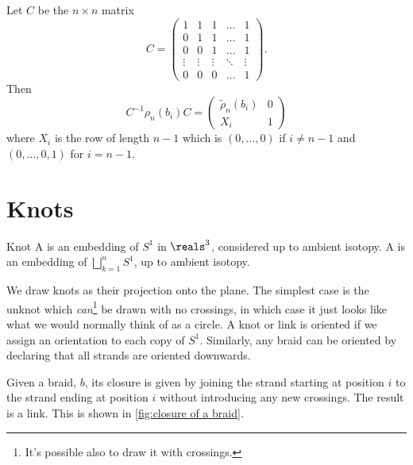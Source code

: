 \documentclass[fleqn]{NotesClass}
\begin{document}
    \begin{lma}{}{}
        Let \(C\) be the \(n \times n\) matrix
        \begin{equation}
            C =
            \begin{pmatrix}
                1 & 1 & 1 & \dots & 1\\
                0 & 1 & 1 & \dots & 1\\
                0 & 0 & 1 & \dots & 1\\
                \vdots & \vdots & \vdots & \ddots & \vdots\\
                0 & 0 & 0 & \dots & 1
            \end{pmatrix}
            .
        \end{equation}
        Then
        \begin{equation}
            C^{-1} \rho_n(b_i)C = 
            \begin{pmatrix}
                \tilde{\rho}_n(b_i) & 0\\
                X_i & 1
            \end{pmatrix}
        \end{equation}
        where \(X_i\) is the row of length \(n - 1\) which is \((0, \dotsc, 0)\) if \(i \ne n - 1\) and \((0, \dotsc, 0, 1)\) for \(i = n - 1\).
    \end{lma}
    
    \section{Knots}
    \label{sec:knots}
    \begin{dfn}{Knot}{}
        A  is an embedding of \(S^1\) in \(\reals^3\), considered up to ambient isotopy.
        A  is an embedding of \(\bigsqcup_{k=1}^n S^1\), up to ambient isotopy.
    \end{dfn}
    
    We draw knots as their projection onto the plane.
    The simplest case is the unknot which \emph{can}\footnote{It's possible also to draw it with crossings.} be drawn with no crossings, in which case it just looks like what we would normally think of as a circle.
    A knot or link is oriented if we assign an orientation to each copy of \(S^1\).
    Similarly, any braid can be oriented by declaring that all strands are oriented downwards.
    
    Given a braid, \(b\), its closure is given by joining the strand starting at position \(i\) to the strand ending at position \(i\) without introducing any new crossings.
    The result is a link.
    This is shown in \cref{fig:closure of a braid}.
    
\end{document}
